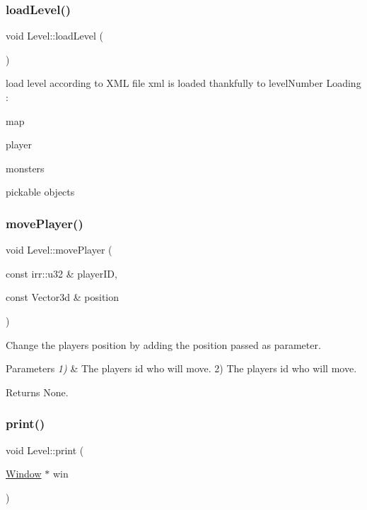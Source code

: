 \subsubsection{\texorpdfstring{load\+Level()}{loadLevel()}}
{\footnotesize\ttfamily void Level\+::load\+Level (\begin{DoxyParamCaption}{ }\end{DoxyParamCaption})}

load level according to X\+ML file xml is loaded thankfully to level\+Number Loading \+:
\begin{DoxyItemize}
\item map
\item player
\item monsters
\item pickable objects 
\end{DoxyItemize}\mbox{\label{classLevel_ac679a141274c19107c288fe40b967e95}} 
\subsubsection{\texorpdfstring{move\+Player()}{movePlayer()}}
{\footnotesize\ttfamily void Level\+::move\+Player (\begin{DoxyParamCaption}\item[{const irr\+::u32 \&}]{player\+ID,  }\item[{const Vector3d \&}]{position }\end{DoxyParamCaption})}



Change the player\textquotesingle{}s position by adding the position passed as parameter. 


\begin{DoxyParams}{Parameters}
{\em 1)} & The player\textquotesingle{}s id who will move. 2) The player\textquotesingle{}s id who will move.\\
\hline
\end{DoxyParams}
\begin{DoxyReturn}{Returns}
None. 
\end{DoxyReturn}
\mbox{\label{classLevel_ab8311fe64b7957d627053359331b0b6b}} 
\subsubsection{\texorpdfstring{print()}{print()}}
{\footnotesize\ttfamily void Level\+::print (\begin{DoxyParamCaption}\item[{\hyperlink{classWindow}{Window} $\ast$}]{win }\end{DoxyParamCaption})\hspace{0.3cm}{\ttfamily [virtual]}}




